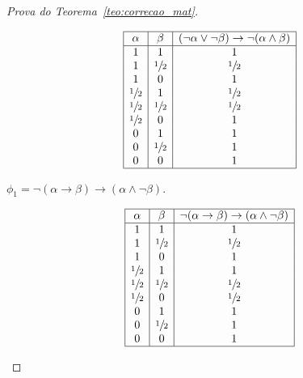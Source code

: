 \begin{proof}[Prova do Teorema~\ref{teo:correcao_mat}]
\begin{provaporcasos}
\begin{provaporsubcasos}
                \begin{center}
                    \[
                        \begin{array}{|c|c|c|}%
                            \hline%
                            \alpha      & \beta & (\neg \alpha \lor \neg \beta) \to \neg (\alpha \land \beta) \\
                            \hline%
                            1 & 1 & 1\\
                            1 & \meio{} & \meio{}\\
                            1 & 0 & 1\\
                            \meio{} & 1 & \meio{}\\
                            \meio{} & \meio{} &\meio{}\\ 
                            \meio{} & 0 & 1\\
                            0 & 1 & 1\\
                            0 & \meio{} & 1\\
                            0 & 0 & 1\\
                            \hline%
                        \end{array}
                    \]
                \end{center}

                \subcasodeprova{} $\phi_{1} = \neg (\alpha \to \beta) \to(\alpha \land \neg \beta)$. 

                \begin{center}
                    \[
                        \begin{array}{|c|c|c|}%
                            \hline%
                            \alpha      & \beta & \neg (\alpha \to \beta) \to(\alpha \land \neg \beta) \\
                            \hline%
                            1 & 1 & 1\\
                            1 & \meio{} & \meio{}\\
                            1 & 0 & 1\\
                            \meio{} & 1 & 1\\
                            \meio{} & \meio{} &\meio{}\\ 
                            \meio{} & 0 & \meio{}\\
                            0 & 1 & 1\\
                            0 & \meio{} & 1\\
                            0 & 0 & 1\\
                            \hline%
                        \end{array}
                    \]
                \end{center}
               


\end{provaporsubcasos}
\end{provaporcasos}
\end{proof}
